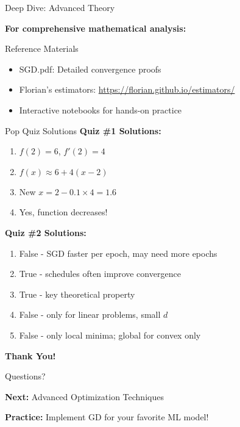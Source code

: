\documentclass[usenames,dvipsnames]{beamer}
\begin{document}
  \begin{frame}{Deep Dive: Advanced Theory}
    \begin{center}
    \textbf{For comprehensive mathematical analysis:}
    \end{center}
    
    \begin{alertbox}{Reference Materials}
    \begin{itemize}
        \item SGD.pdf: Detailed convergence proofs  
        \item Florian's estimators: \url{https://florian.github.io/estimators/}
        \item Interactive notebooks for hands-on practice
    \end{itemize}
    \end{alertbox}
  \end{frame}


  \begin{frame}{Pop Quiz Solutions}
    \textbf{Quiz \#1 Solutions:} 
    \begin{enumerate}
        \item $f(2) = 6$, $f'(2) = 4$
        \item $f(x) \approx 6 + 4(x-2)$
        \item New $x = 2 - 0.1 \times 4 = 1.6$
        \item Yes, function decreases!
    \end{enumerate}
    
    \pause
    \textbf{Quiz \#2 Solutions:}
    \begin{enumerate}
        \item False - SGD faster per epoch, may need more epochs
        \item True - schedules often improve convergence
        \item True - key theoretical property  
        \item False - only for linear problems, small $d$
        \item False - only local minima; global for convex only
    \end{enumerate}
  \end{frame}

  \begin{frame}
    \centering
    \Huge \textbf{Thank You!}
    
    \vspace{1cm}
    \Large Questions?
    
    \vspace{1cm}
    \normalsize
    \textbf{Next:} Advanced Optimization Techniques
    
    \textbf{Practice:} Implement GD for your favorite ML model!
  \end{frame}
\end{document}
